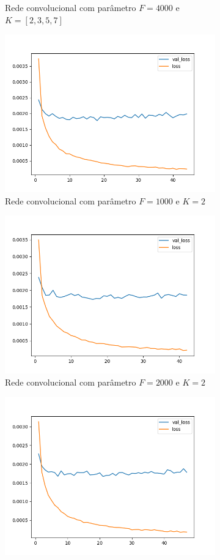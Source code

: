 \begin{figure}[H]
\begin{subfigure}{.5\textwidth}
  \caption{Rede convolucional com parâmetro $F = 4000$ e $K = [2, 3, 5, 7]$}
  \label{fig:cnn-4000}
\end{subfigure}
\begin{subfigure}{.5\textwidth}
  \centering
  \includegraphics[width=.8\linewidth]{figuras/ape-ajustes-hiper-parametros/cnn-1000-k-2.png}
  \caption{Rede convolucional com parâmetro $F = 1000$ e $K = 2$}
  \label{fig:cnn-1000-k-2-v2}
\end{subfigure}
\begin{subfigure}{.5\textwidth}
  \centering
  \includegraphics[width=.8\linewidth]{figuras/ape-ajustes-hiper-parametros/cnn-2000-k-2.png}
  \caption{Rede convolucional com parâmetro $F = 2000$ e $K = 2$}
  \label{fig:cnn-2000-k-2-v2}
\end{subfigure}
\begin{subfigure}{.5\textwidth}
  \centering
  \includegraphics[width=.8\linewidth]{figuras/ape-ajustes-hiper-parametros/cnn-4000-k-2.png}

\end{subfigure}
\end{figure}
